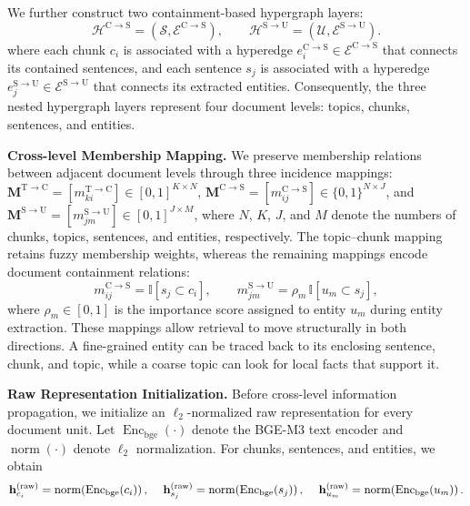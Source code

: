\documentclass{article} %
\begin{document}
We further construct two containment-based hypergraph layers:
\begin{equation}
\mathcal{H}^{\mathrm{C}\to\mathrm{S}}
=
\left(
\mathcal{S},
\mathcal{E}^{\mathrm{C}\to\mathrm{S}}
\right),
\qquad
\mathcal{H}^{\mathrm{S}\to\mathrm{U}}
=
\left(
\mathcal{U},
\mathcal{E}^{\mathrm{S}\to\mathrm{U}}
\right).
\label{eq:containment_hypergraphs}
\end{equation}
where each chunk $c_i$ is associated with a hyperedge \(e_i^{\mathrm{C}\to\mathrm{S}}\in\mathcal{E}^{\mathrm{C}\to\mathrm{S}}\) that connects its contained sentences, and each sentence $s_j$ is associated with a hyperedge \(e_j^{\mathrm{S}\to\mathrm{U}}\in\mathcal{E}^{\mathrm{S}\to\mathrm{U}}\) that connects its extracted entities. Consequently, the three nested hypergraph layers represent four document levels: topics, chunks, sentences, and entities.

\smallskip
\noindent\textbf{Cross-level Membership Mapping.}
We preserve membership relations between adjacent document levels through
three incidence mappings:
$\mathbf{M}^{\mathrm{T}\to\mathrm{C}}=[m_{ki}^{\mathrm{T}\to\mathrm{C}}]
\in[0,1]^{K\times N}$,
$\mathbf{M}^{\mathrm{C}\to\mathrm{S}}
=[m_{ij}^{\mathrm{C}\to\mathrm{S}}]\in\{0,1\}^{N\times J}$, and
$\mathbf{M}^{\mathrm{S}\to\mathrm{U}}
=[m_{jm}^{\mathrm{S}\to\mathrm{U}}]\in[0,1]^{J\times M}$,
where $N$, $K$, $J$, and $M$ denote the numbers of chunks, topics, sentences, and entities, respectively. The topic--chunk mapping retains fuzzy membership weights, whereas the remaining mappings encode document containment relations:
\begin{equation}
m_{ij}^{\mathrm{C}\to\mathrm{S}}
=
\mathbb{I}[s_j \subset c_i],
\qquad
m_{jm}^{\mathrm{S}\to\mathrm{U}}
=
\rho_m\,\mathbb{I}[u_m \subset s_j],
\label{eq:containment_membership_mapping}
\end{equation}
where $\rho_m\in[0,1]$ is the importance score assigned to entity $u_m$ during entity extraction. These mappings allow retrieval to move structurally in both directions. A fine-grained entity can be traced back to its enclosing sentence, chunk, and topic, while a coarse topic can look for local facts that support it.


\smallskip
\noindent\textbf{Raw Representation Initialization.}
Before cross-level information propagation, we initialize an $\ell_2$-normalized raw representation for every document unit. Let $\operatorname{Enc}_{\mathrm{bge}}(\cdot)$ denote the BGE-M3 text encoder and $\operatorname{norm}(\cdot)$ denote $\ell_2$ normalization. For chunks, sentences, and entities, we obtain
\begin{equation}
\mathbf{h}_{c_i}^{(\mathrm{raw})}
=
\operatorname{norm}\!\left(
\operatorname{Enc}_{\mathrm{bge}}(c_i)
\right),
\hspace{1.2em}
\mathbf{h}_{s_j}^{(\mathrm{raw})}
=
\operatorname{norm}\!\left(
\operatorname{Enc}_{\mathrm{bge}}(s_j)
\right),
\hspace{1.2em}
\mathbf{h}_{u_m}^{(\mathrm{raw})}
=
\operatorname{norm}\!\left(
\operatorname{Enc}_{\mathrm{bge}}(u_m)
\right).
\label{eq:raw_representations}
\end{equation}
\end{document}

